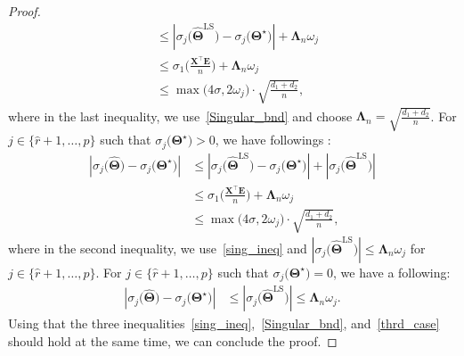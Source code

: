 \documentclass[12pt]{article}
\begin{document}
\begin{proof}
\begin{align}
    &\leq \left|\sigma_{j}\big(\widehat{\boldsymbol{\Theta}}^{\text{LS}}\big)
    -\sigma_{j}\big(\boldsymbol{\Theta}^{\star}\big)\right| + \boldsymbol{\Lambda}_{n}\omega_{j} \nonumber \\
    &\leq \sigma_{1}\bigg( \frac{\boldsymbol{X}^{\top}\boldsymbol{E}}{n} \bigg) + \boldsymbol{\Lambda}_{n}\omega_{j} \nonumber \\
    &\leq \max\big(4\sigma,2\omega_{j}\big)\cdot \sqrt{\frac{d_{1}+d_{2}}{n}},  \nonumber 
\end{align}
where in the last inequality, we use~\eqref{Singular_bnd} and choose $\boldsymbol{\Lambda}_{n}=\sqrt{\frac{d_{1}+d_{2}}{n}}$. 
For $j\in\{\widehat{r}+1,\dots,p\}$ such that $\sigma_{j}\big( \boldsymbol{\Theta}^{\star} \big) > 0$, we have followings :
\begin{align}
    \left| \sigma_{j}\big(\widehat{\boldsymbol{\Theta}}\big)-\sigma_{j}\big(\boldsymbol{\Theta}^{\star}\big)\right|
    &\leq \left|\sigma_{j}\big(\widehat{\boldsymbol{\Theta}}^{\text{LS}}\big)
    -\sigma_{j}\big(\boldsymbol{\Theta}^{\star}\big)\right| + \left| \sigma_{j}\big(\widehat{\boldsymbol{\Theta}}^{\text{LS}}\big) \right| \nonumber \\
    &\leq \sigma_{1}\bigg( \frac{\boldsymbol{X}^{\top}\boldsymbol{E}}{n} \bigg) + \boldsymbol{\Lambda}_{n}\omega_{j} \nonumber \\
    &\leq \max\big(4\sigma,2\omega_{j}\big)\cdot \sqrt{\frac{d_{1}+d_{2}}{n}},  \nonumber 
\end{align}
where in the second inequality, we use~\eqref{sing_ineq} and $| \sigma_{j}\big(\widehat{\boldsymbol{\Theta}}^{\text{LS}}\big) |\leq \boldsymbol{\Lambda}_{n}\omega_{j}$ for $j\in\{\widehat{r}+1,\dots,p\}$.
For $j\in\{\widehat{r}+1,\dots,p\}$ such that $\sigma_{j}\big( \boldsymbol{\Theta}^{\star} \big) = 0$, we have a following:
\begin{align}\label{thrd_case}
    \left| \sigma_{j}\big(\widehat{\boldsymbol{\Theta}}\big)-\sigma_{j}\big(\boldsymbol{\Theta}^{\star}\big)\right|
    &\leq \left| \sigma_{j}\big(\widehat{\boldsymbol{\Theta}}^{\text{LS}}\big) \right| \leq \boldsymbol{\Lambda}_{n}\omega_{j}.
\end{align}
Using that the three inequalities~\eqref{sing_ineq},~\eqref{Singular_bnd}, and~\eqref{thrd_case} should hold at the same time, we can conclude the proof.
\end{proof}
\end{document}
